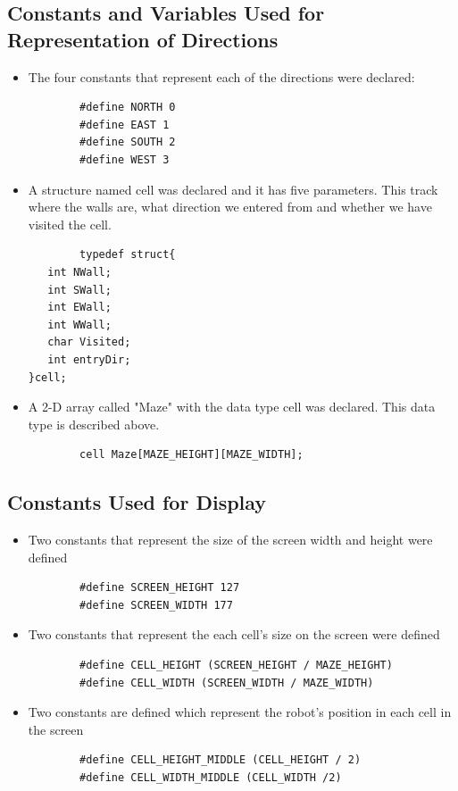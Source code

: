 \documentclass[11pt]{article}
\begin{document}

\subsection{Constants and Variables Used for Representation of Directions}
\begin{itemize}
\item The four constants that represent each of the directions were declared:
	\begin{verbatim}
		#define NORTH 0
		#define EAST 1
		#define SOUTH 2
		#define WEST 3
	\end{verbatim}
\item A structure named cell was declared and it has five parameters. This track where the walls are, what direction we entered from and whether we have visited the cell.
	\begin{verbatim}
		typedef struct{
   int NWall; 
   int SWall; 
   int EWall; 
   int WWall; 
   char Visited;
   int entryDir;
}cell;\end{verbatim}
\item A 2-D array called "Maze" with the data type cell was declared. This data type is described above.
	\begin{verbatim}
		cell Maze[MAZE_HEIGHT][MAZE_WIDTH];
	\end{verbatim}
\end{itemize}


\subsection{Constants Used for Display}
\begin{itemize}
\item Two constants that represent the size of the screen width and height were defined
	\begin{verbatim}
		#define SCREEN_HEIGHT 127
		#define SCREEN_WIDTH 177 
	\end{verbatim} 
\item Two constants that represent the each cell's size on the screen were defined
	\begin{verbatim}
		#define CELL_HEIGHT (SCREEN_HEIGHT / MAZE_HEIGHT)
		#define CELL_WIDTH (SCREEN_WIDTH / MAZE_WIDTH)
	\end{verbatim} 
\item Two constants are defined which represent the robot's position in each cell in the screen
	\begin{verbatim}
		#define CELL_HEIGHT_MIDDLE (CELL_HEIGHT / 2)
		#define CELL_WIDTH_MIDDLE (CELL_WIDTH /2)
	\end{verbatim}
\end{itemize}
\newpage
\end{document}

